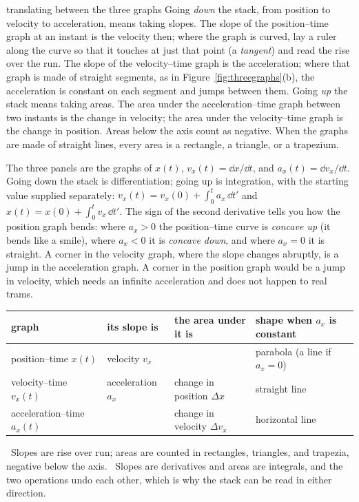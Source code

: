 \begin{twoviews}{translating between the three graphs}
\elem Going \emph{down} the stack, from position to velocity to acceleration, means taking slopes. The slope of the position--time graph at an instant is the velocity then; where the graph is curved, lay a ruler along the curve so that it touches at just that point (a \emph{tangent}) and read the rise over the run. The slope of the velocity--time graph is the acceleration; where that graph is made of straight segments, as in Figure~\ref{fig:threegraphs}(b), the acceleration is constant on each segment and jumps between them. Going \emph{up} the stack means taking areas. The area under the acceleration--time graph between two instants is the change in velocity; the area under the velocity--time graph is the change in position. Areas below the axis count as negative. When the graphs are made of straight lines, every area is a rectangle, a triangle, or a trapezium.

\calc The three panels are the graphs of $x(t)$, $v_x(t) = \dd x/\dd t$, and $a_x(t) = \dd v_x/\dd t$. Going down the stack is differentiation; going up is integration, with the starting value supplied separately: $v_x(t) = v_x(0) + \int_0^t a_x\,\dd t'$ and $x(t) = x(0) + \int_0^t v_x\,\dd t'$. The sign of the second derivative tells you how the position graph bends: where $a_x > 0$ the position--time curve is \emph{concave up} (it bends like a smile), where $a_x < 0$ it is \emph{concave down}, and where $a_x = 0$ it is straight. A corner in the velocity graph, where the slope changes abruptly, is a jump in the acceleration graph. A corner in the position graph would be a jump in velocity, which needs an infinite acceleration and does not happen to real trams.
\end{twoviews}

\begin{keyidea}
\begin{center}
\renewcommand{\arraystretch}{1.3}
\small
\begin{tabular}{llll}
\toprule
graph & its slope is & the area under it is & shape when $a_x$ is constant \\
\midrule
position--time $x(t)$ & velocity $v_x$ & & parabola (a line if $a_x = 0$) \\
velocity--time $v_x(t)$ & acceleration $a_x$ & change in position $\Delta x$ & straight line \\
acceleration--time $a_x(t)$ & & change in velocity $\Delta v_x$ & horizontal line \\
\bottomrule
\end{tabular}
\end{center}
\elemtag\ Slopes are rise over run; areas are counted in rectangles, triangles, and trapezia, negative below the axis. \calctag\ Slopes are derivatives and areas are integrals, and the two operations undo each other, which is why the stack can be read in either direction.
\end{keyidea}

